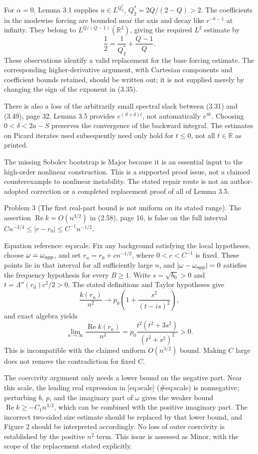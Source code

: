 \documentclass[10pt]{article}
\begin{document}
For \(\alpha=0\), Lemma 3.1 supplies \(u\in L^{Q_2^*}\), \(Q_2^*=2Q/(2-Q)>2\). The coefficients in the modewise forcing are bounded near the axis and decay like \(r^{-b-1}\) at infinity. They belong to \(L^{Q/(Q-1)}(\mathbb R^2)\), giving the required \(L^2\) estimate by \[\frac12=\frac1{Q_2^*}+\frac{Q-1}{Q}.\] These observations identify a valid replacement for the base forcing estimate. The corresponding higher-derivative argument, with Cartesian components and coefficient bounds retained, should be written out; it is not supplied merely by changing the sign of the exponent in (3.35).\par
There is also a loss of the arbitrarily small spectral slack between (3.31) and (3.49), page 32. Lemma 3.5 provides \(e^{(S+\delta)t}\), not automatically \(e^{St}\). Choosing \(0<\delta<2a-S\) preserves the convergence of the backward integral. The estimates on Picard iterates used subsequently need only hold for \(t\le0\), not all \(t\in\mathbb R\) as printed.\par
The missing Sobolev bootstrap is Major because it is an essential input to the high-order nonlinear construction. This is a supported proof issue, not a claimed counterexample to nonlinear instability. The stated repair route is not an author-adopted correction or a completed replacement proof of all of Lemma 3.5.\par
Problem 3 (The first real-part bound is not uniform on its stated range).  The assertion \(\operatorname{Re}k=O(n^{3/2})\) in (2.58), page 16, is false on the full interval \(Cn^{-3/4}\le |r-r_0|\le C^{-1}n^{-1/2}\).\par
Equation reference: eq:scale. Fix any background satisfying the local hypotheses, choose \(\omega=\omega_{\rm app}\), and set \(r_n=r_0+c n^{-1/2}\), where \(0<c<C^{-1}\) is fixed. These points lie in that interval for all sufficiently large \(n\), and \(|\omega-\omega_{\rm app}|=0\) satisfies the frequency hypothesis for every \(B\ge1\). Write \(s=\sqrt{b_0}>0\) and \(t=\Lambda''(r_0)c^2/2>0\). The stated definitions and Taylor hypotheses give \[\frac{k(r_n)}{n^2}\longrightarrow
 p_0\left(1+\frac{s^2}{(t-is)^2}\right),\] and exact algebra yields \[\lim_{n\to\infty}\frac{\operatorname{Re}k(r_n)}{n^2}
 =p_0\frac{t^2(t^2+3s^2)}{(t^2+s^2)^2}>0.
 \] This is incompatible with the claimed uniform \(O(n^{3/2})\) bound. Making \(C\) large does not remove the contradiction for fixed \(C\).\par
The coercivity argument only needs a lower bound on the negative part. Near this scale, the leading real expression in [eq:scale] (\#eq:scale) is nonnegative; perturbing \(b\), \(p\), and the imaginary part of \(\omega\) gives the weaker bound \(\operatorname{Re}k\ge -C_1n^{3/2}\), which can be combined with the positive imaginary part. The incorrect two-sided size estimate should be replaced by that lower bound, and Figure 2 should be interpreted accordingly. No loss of outer coercivity is established by the positive \(n^2\) term. This issue is assessed as Minor, with the scope of the replacement stated explicitly.\par
\end{document}
